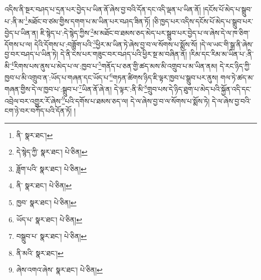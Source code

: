 འདིས་ནི་སྔར་བཤད་པ་དྲན་པར་བྱེད་པ་ཡིན་ནོ་ཞེས་བྱ་བའི་དོན་དང་འདི་ལྡན་པ་ཡིན་ནོ། །དངོས་པོ་མེད་པ་སྒྲུབ་པ་:ནི་མ་\footnote{ནི་  སྣར་ཐང་། }མཐོང་བ་ཙམ་གྱིས་དགག་པ་མ་ཡིན་པར་བཤད་ཟིན་ཏོ། །ཅི་ཁྱད་པར་འདིས་དངོས་པོ་མེད་པ་སྒྲུབ་པར་བྱེད་པ་ཡིན་ན། ཇི་སྙེད་པ་:དེ་སྙེད་ཀྱིས་\footnote{དེ་སྙེད་ཀྱི་  སྣར་ཐང་།  པེ་ཅིན། }མ་མཐོང་བ་ཐམས་ཅད་མེད་པར་སྒྲུབ་པར་བྱེད་པ་ལ་ཞེས་དེ་ལ་ཁ་ཅིག་དོགས་པ་ལ། དེའི་དོགས་པ་:བཟློག་པའི་\footnote{ཟློག་པའི་  སྣར་ཐང་།  པེ་ཅིན། }ཕྱིར་མ་ཡིན་ཏེ་ཞེས་བྱ་བ་ལ་སོགས་པ་སྨོས་སོ། །དེ་ལ་ཡང་གི་སྒྲ་ནི་ཞེས་བྱ་བར་བཤད་པ་ཡིན་ཏེ། དེ་ནི་ངེས་པར་གཟུང་བར་བཤད་པའི་ཕྱིར་སྔ་མ་བཞིན་ནོ། །རིམ་དང་རིམ་མ་ཡིན་པ་:ནི་མི་\footnote{ནི་  སྣར་ཐང་།  པེ་ཅིན། }རིགས་པས་ནུས་པ་མེད་པ་ལ་:ཁྱབ་པ་\footnote{ཁྱབ་  སྣར་ཐང་།  པེ་ཅིན། }གནོད་པ་ཅན་གྱི་ཚད་མས་མི་འགྲུབ་པ་མ་ཡིན་ནམ། དེ་རང་ཉིད་ཀྱི་ཁྱབ་པ་མི་འགྲུབ་ན་:ཡོད་པ་གཞན་དང་ཡོད་པ་\footnote{ཡོད་པ་  སྣར་ཐང་།  པེ་ཅིན། }གཏན་ཚིགས་ཉིད་ཇི་ལྟར་ཁྱབ་པ་སྒྲུབ་པར་ནུས། གལ་ཏེ་ཚད་མ་གཞན་གྱིས་དེ་ལ་ཁྱབ་པ་:སྒྲུབ་པ་\footnote{བསྒྲུབ་པ་  སྣར་ཐང་།  པེ་ཅིན། }ཡིན་ནོ་ཞེ་ན། དེ་ལྟར་:ནི་མི་\footnote{ནི་མའི་  སྣར་ཐང་། }གྲུབ་པས་དེ་ཉིད་ཐུག་པ་མེད་པའི་སྐྱོན་འདི་དང་འབྲེལ་བར་འགྱུར་རོ་ཞེས་\footnote{ཞེས་འགའ་ཞེས་  སྣར་ཐང་།  པེ་ཅིན། }པའི་དགོས་པ་ཐམས་ཅད་ལ། དེ་ལ་ཞེས་བྱ་བ་ལ་སོགས་པ་སྨོས་ཏེ། དེ་ལ་ཞེས་བྱ་བའི་ངག་ཉེ་བར་བཀོད་པའི་དོན་ཏོ། །

